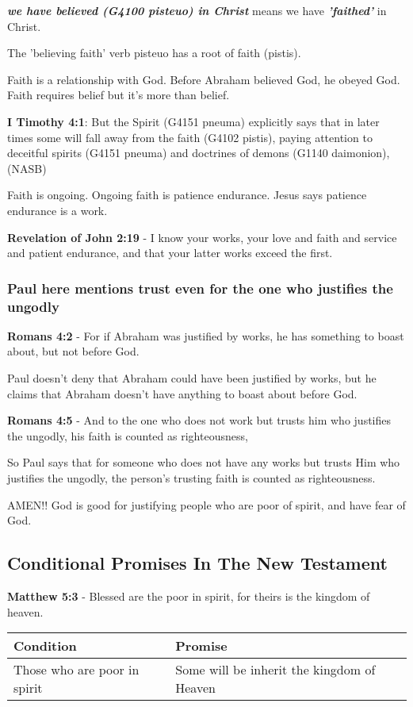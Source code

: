 \documentclass[11pt]{article}
\begin{document}
\emph{\textbf{we have believed (G4100 pisteuo) in Christ}} means we have \emph{\textbf{'faithed'}} in Christ.

The 'believing faith' verb pisteuo has a root of faith (pistis).

Faith is a relationship with God.
Before Abraham believed God, he obeyed God.
Faith requires belief but it's more than belief.

\textbf{I Timothy 4:1}: But the Spirit (G4151 pneuma) explicitly says that in later times some will fall away from the faith (G4102 pistis), paying attention to deceitful spirits (G4151 pneuma) and doctrines of demons (G1140 daimonion), (NASB)

Faith is ongoing. Ongoing faith is patience endurance. Jesus says patience endurance is a work.

\textbf{Revelation of John 2:19} - I know your works, your love and faith and service and patient endurance, and that your latter works exceed the first.

\subsubsection{Paul here mentions trust even for the one who justifies the ungodly}
\label{sec:orgacf2a3d}
\textbf{Romans 4:2} - For if Abraham was justified by works, he has something to boast about, but not before God.

Paul doesn't deny that Abraham could have been
justified by works, but he claims that Abraham
doesn't have anything to boast about before
God.

\textbf{Romans 4:5} - And to the one who does not work but trusts him who justifies the ungodly, his faith is counted as righteousness,

So Paul says that for someone who does not
have any works but trusts Him who justifies
the ungodly, the person's trusting faith is
counted as righteousness.

AMEN!! God is good for justifying people who are poor of spirit, and have fear of God.

\subsection{Conditional Promises In The New Testament}
\label{sec:org752f558}
\textbf{Matthew 5:3} - Blessed are the poor in spirit, for theirs is the kingdom of heaven.

\begin{center}
\begin{tabular}{ll}
Condition & Promise\\[0pt]
\hline
Those who are poor in spirit & Some will be inherit the kingdom of Heaven\\[0pt]
\end{tabular}
\end{center}
\end{document}
